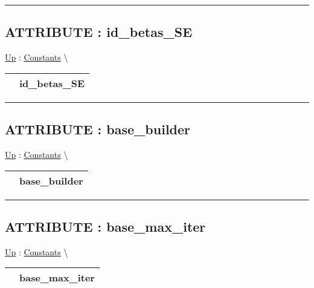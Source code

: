 \par


\rule{\linewidth}{0.5pt}
\subsection*{ATTRIBUTE : id\_betas\_SE}
\hypertarget{ecldoc:logisticregression.constants.id_betas_se}{}
\hyperlink{ecldoc:LogisticRegression.Constants}{Up} :
\hspace{0pt} \hyperlink{ecldoc:LogisticRegression.Constants}{Constants} \textbackslash 

{\renewcommand{\arraystretch}{1.5}
\begin{tabularx}{\textwidth}{|>{\raggedright\arraybackslash}l|X|}
\hline
\hspace{0pt} & id\_betas\_SE \\
\hline
\end{tabularx}
}

\par


\rule{\linewidth}{0.5pt}
\subsection*{ATTRIBUTE : base\_builder}
\hypertarget{ecldoc:logisticregression.constants.base_builder}{}
\hyperlink{ecldoc:LogisticRegression.Constants}{Up} :
\hspace{0pt} \hyperlink{ecldoc:LogisticRegression.Constants}{Constants} \textbackslash 

{\renewcommand{\arraystretch}{1.5}
\begin{tabularx}{\textwidth}{|>{\raggedright\arraybackslash}l|X|}
\hline
\hspace{0pt} & base\_builder \\
\hline
\end{tabularx}
}

\par


\rule{\linewidth}{0.5pt}
\subsection*{ATTRIBUTE : base\_max\_iter}
\hypertarget{ecldoc:logisticregression.constants.base_max_iter}{}
\hyperlink{ecldoc:LogisticRegression.Constants}{Up} :
\hspace{0pt} \hyperlink{ecldoc:LogisticRegression.Constants}{Constants} \textbackslash 

{\renewcommand{\arraystretch}{1.5}
\begin{tabularx}{\textwidth}{|>{\raggedright\arraybackslash}l|X|}
\hline
\hspace{0pt} & base\_max\_iter \\
\hline
\end{tabularx}
}

